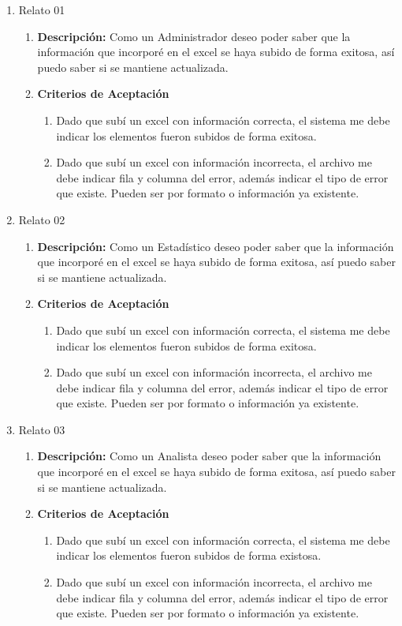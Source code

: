 \begin{enumerate}
	\item Relato 01
		\begin{enumerate}
			\item \textbf{Descripción:} Como un Administrador deseo poder saber que la información que incorporé en el excel se haya subido de forma exitosa, así puedo saber si se mantiene actualizada.
			\item \textbf{Criterios de Aceptación}
				\begin{enumerate}
					\item Dado que subí un excel con información correcta, el sistema me debe indicar los elementos fueron subidos de forma exitosa.
					\item Dado que subí un excel con información incorrecta, el archivo me debe indicar fila y columna del error, además indicar el tipo de error que existe. Pueden ser por formato o información ya existente.
				\end{enumerate}
		\end{enumerate}
	\item Relato 02
		\begin{enumerate}
			\item \textbf{Descripción:} Como un Estadístico deseo poder saber que la información que incorporé en el excel se haya subido de forma exitosa, así puedo saber si se mantiene actualizada.
			\item \textbf{Criterios de Aceptación}
				\begin{enumerate}
					\item Dado que subí un excel con información correcta, el sistema me debe indicar los elementos fueron subidos de forma exitosa.
					\item Dado que subí un excel con información incorrecta, el archivo me debe indicar fila y columna del error, además indicar el tipo de error que existe. Pueden ser por formato o información ya existente.
				\end{enumerate}
		\end{enumerate}
	\item Relato 03
		\begin{enumerate}
			\item \textbf{Descripción:} Como un Analista deseo poder saber que la información que incorporé en el excel se haya subido de forma exitosa, así puedo saber si se mantiene actualizada.
			\item \textbf{Criterios de Aceptación}
				\begin{enumerate}
					\item Dado que subí un excel con información correcta, el sistema me debe indicar los elementos fueron subidos de forma existosa.
					\item Dado que subí un excel con información incorrecta, el archivo me debe indicar fila y columna del error, además indicar el tipo de error que existe. Pueden ser por formato o información ya existente.
				\end{enumerate}
		\end{enumerate}
\end{enumerate}

